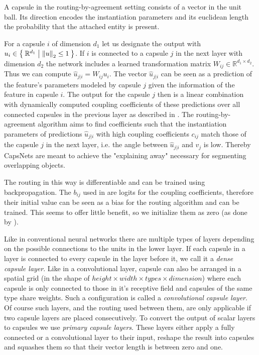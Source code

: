 \newcommand{\uhat}{\hat{u}_{j \vert i}}

A capsule in the routing-by-agreement setting consists of a vector in the unit ball.
Its direction encodes the instantiation parameters and its euclidean length the probability that the attached entity is present.

For a capsule $i$ of dimension $d_1$ let us designate the output with $u_i \in \Set{ \mathbb{R}^{d_1} | \left \lVert u \right \rVert _{2} \leq 1}$.
If $i$ is connected to a capsule $j$ in the next layer with dimension $d_2$ the network includes a learned transformation matrix $W_{ij} \in \mathbb{R}^{d_1 \times d_2}$.
Thus we can compute $\uhat = W_{ij} u_i$.
The vector $\uhat$ can be seen as a prediction of the feature's parameters modeled by capsule $j$ given the information of the feature in capsule $i$.
The output for the capsule $j$ then is a linear combination with dynamically computed coupling coefficients of these predictions over all connected capsules in the previous layer as described in .
The routing-by-agreement algorithm aims to find coefficients such that the instantiation parameters of predictions $\uhat$ with high coupling coefficients $c_{ij}$ match those of the capsule $j$ in the next layer, i.e. the angle between $\uhat$ and $v_j$ is low.
Thereby CapsNets are meant to achieve the "explaining away" necessary for segmenting overlapping objects.

The routing in this way is differentiable and can be trained using backpropagation.
The $b_{ij}$ used in  are logits for the coupling coefficients, therefore their initial value can be seen as a bias for the routing algorithm and can be trained.
This seems to offer little benefit, so we initialize them as zero (as done by \cite{capsules}).

Like in conventional neural networks there are multiple types of layers depending on the possible connections to the units in the lower layer.
If each capsule in a layer is connected to every capsule in the layer before it, we call it a \emph{dense capsule layer}.
Like in a convolutional layer, capsule can also be arranged in a spatial grid (in the shape of $height \times width \times types \times dimension$) where each capsule is only connected to those in it's receptive field and capsules of the same type share weights.
Such a configuration is called a \emph{convolutional capsule layer}.
Of course such layers, and the routing used between them, are only applicable if two capsule layers are placed consecutively.
To convert the output of scalar layers to capsules we use \emph{primary capsule layers}.
These layers either apply a fully connected or a convolutional layer to their input, reshape the result into capsules and squashes them so that their vector length is between zero and one.

